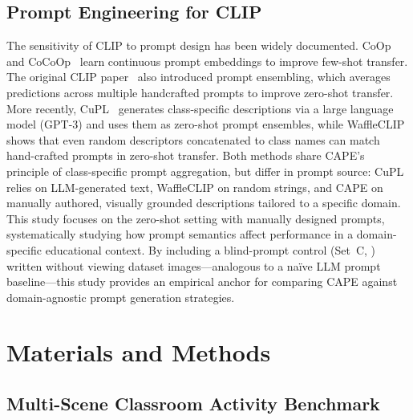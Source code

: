\documentclass[electronics,article,submit,pdftex,moreauthors]{Definitions/mdpi}
\begin{document}
\subsection{Prompt Engineering for CLIP}

The sensitivity of CLIP to prompt design has been widely documented.
CoOp~\cite{zhou2022learning} and CoCoOp~\cite{zhou2022conditional} learn continuous prompt embeddings to improve few-shot transfer.
The original CLIP paper~\cite{radford2021learning} also introduced prompt ensembling, which averages predictions across multiple handcrafted prompts to improve zero-shot transfer.
More recently, CuPL~\cite{pratt2023cupl} generates class-specific descriptions via a large language model (GPT-3) and uses them as zero-shot prompt ensembles, while WaffleCLIP~\cite{roth2023waffleclip} shows that even random descriptors concatenated to class names can match hand-crafted prompts in zero-shot transfer.
Both methods share CAPE's principle of class-specific prompt aggregation, but differ in prompt source: CuPL relies on LLM-generated text, WaffleCLIP on random strings, and CAPE on manually authored, visually grounded descriptions tailored to a specific domain.
This study focuses on the zero-shot setting with manually designed prompts, systematically studying how prompt semantics affect performance in a domain-specific educational context.
By including a blind-prompt control (Set~C, ) written without viewing dataset images---analogous to a na\"ive LLM prompt baseline---this study provides an empirical anchor for comparing CAPE against domain-agnostic prompt generation strategies.


\section{Materials and Methods}
\label{sec:method}

\subsection{Multi-Scene Classroom Activity Benchmark}
\label{sec:dataset}
\end{document}

